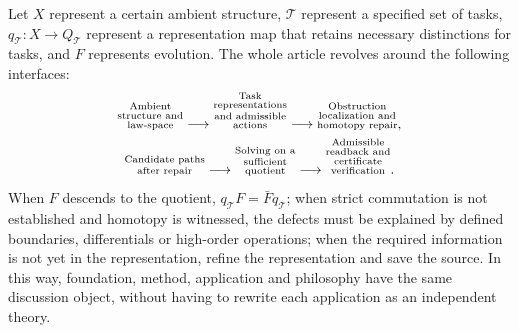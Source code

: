\documentclass[11pt,a4paper]{article}
\theoremstyle{plain}
\theoremstyle{definition}
\theoremstyle{remark}
\begin{document}
\begin{CJK*}
Let $X$ represent a certain ambient structure, $\mathcal T$ represent a specified set of tasks, $q_{\mathcal T}:X\to Q_{\mathcal T}$ represent a representation map that retains necessary distinctions for tasks, and $F$ represents evolution. The whole article revolves around the following interfaces: \begin{equation}
\label{eq:global-spine}
\begin{gathered}
\text{\shortstack[c]{\scriptsize Ambient\\[-1pt]\scriptsize structure and\\[-1pt]\scriptsize law-space}}
\longrightarrow \text{\shortstack[c]{\scriptsize Task\\[-1pt]\scriptsize representations\\[-1pt]\scriptsize and admissible\\[-1pt]\scriptsize actions}}
\longrightarrow \text{\shortstack[c]{\scriptsize Obstruction\\[-1pt]\scriptsize localization and\\[-1pt]\scriptsize homotopy repair}},\\
\text{\shortstack[c]{\scriptsize Candidate paths\\[-1pt]\scriptsize after repair}}
\longrightarrow \text{\shortstack[c]{\scriptsize Solving on a\\[-1pt]\scriptsize sufficient\\[-1pt]\scriptsize quotient}}
\longrightarrow \text{\shortstack[c]{\scriptsize Admissible\\[-1pt]\scriptsize readback and\\[-1pt]\scriptsize certificate\\[-1pt]\scriptsize verification}}.
\end{gathered}
\end{equation} When $F$ descends to the quotient, $q_{\mathcal T}F=\bar Fq_{\mathcal T}$; when strict commutation is not established and homotopy is witnessed, the defects must be explained by defined boundaries, differentials or high-order operations; when the required information is not yet in the representation, refine the representation and save the source. In this way, foundation, method, application and philosophy have the same discussion object, without having to rewrite each application as an independent theory.


\end{CJK*}
\end{document}
